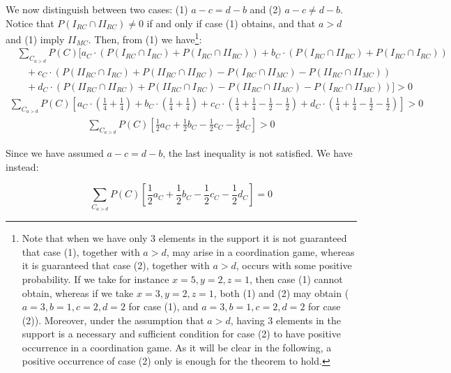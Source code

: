 \documentclass[fleqn,reqno,11pt]{article}
\begin{document}
\noindent We now distinguish between two cases: (1) $ a-c = d-b $ and (2) $  a-c \neq d-b $. Notice that $P(I_{RC}\cap II_{RC}) \neq 0$ if and only if case (1) obtains, and that $a>d$ and (1) imply $II_{MC}$. Then, from (1) we have\footnote{Note that when we have only 3 elements in the support it is not guaranteed that case (1), together with $a>d$, may arise in a coordination game, whereas it is guaranteed that case (2), together with $a>d$, occurs with some positive probability. If we take for instance $x= 5, y= 2, z= 1$, then case (1) cannot obtain, whereas if we take $x= 3, y= 2, z= 1$, both (1) and (2) may obtain ($a=3, b=1, c=2, d=2$ for case (1), and $a=3, b=1, c=2, d=2$ for case (2)). Moreover, under the assumption that $a>d$, having 3 elements in the support is a necessary and sufficient condition for case (2) to have positive occurrence in a coordination game. As it will be clear in the following, a positive occurrence of case (2) only is enough for the theorem to hold.}:
\begin{align*} 
& \textstyle{\sum_{C_{a>d}}} P(C)[a_{C} \cdot (P(I_{RC}\cap I_{RC}) + P(I_{RC}\cap II_{RC})) + b_{C} \cdot  (P(I_{RC}\cap II_{RC}) + P(I_{RC}\cap I_{RC}))\\
& \ \ \ \ + c_{C} \cdot (P(II_{RC}\cap I_{RC}) +P(II_{RC}\cap II_{RC})- P(I_{RC}\cap II_{MC})- P(II_{RC}\cap II_{MC}))\\
& \ \ \ \ + d_{C} \cdot (P(II_{RC}\cap II_{RC})+P(II_{RC}\cap I_{RC})- P(II_{RC}\cap II_{MC})- P(I_{RC}\cap II_{MC}))]> 0
\end{align*}
\begin{align*}
\textstyle{\sum_{C_{a>d}}} P(C)[a_{C} \cdot (\frac{1}{4}+\frac{1}{4}) + b_{C} \cdot  (\frac{1}{4}+\frac{1}{4}) + c_{C} \cdot (\frac{1}{4}+\frac{1}{4}-\frac{1}{2}-\frac{1}{2}) + d_{C} \cdot (\frac{1}{4}+\frac{1}{4}-\frac{1}{2}-\frac{1}{2})]> 0
\end{align*}
\begin{align*}
\textstyle{\sum_{C_{a>d}}} P(C)[\frac{1}{2}a_{C}+ \frac{1}{2}b_{C} - \frac{1}{2}c_{C} - \frac{1}{2}d_{C}]> 0
\end{align*}

\noindent Since we have assumed $ a-c = d-b $, the last inequality is not satisfied. We have instead:

$$ \sum_{C_{a>d}} P(C)[\frac{1}{2}a_{C}+ \frac{1}{2}b_{C} - \frac{1}{2}c_{C} - \frac{1}{2}d_{C}]= 0 $$
\end{document}
